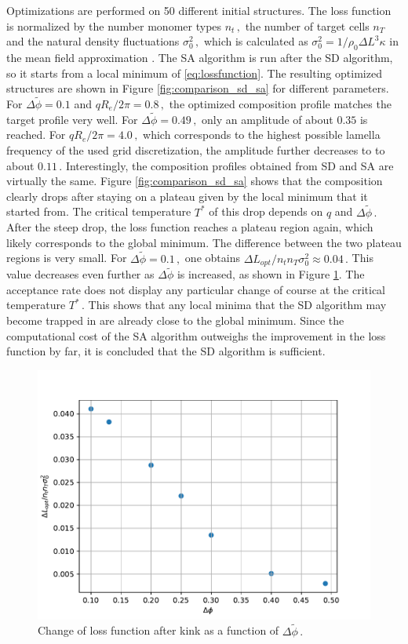 \documentclass[bachelor,       %
               twoside,        %
               BCOR10mm,       %
               ngerman, english %
               ]{GAUBM}
\begin{document}
Optimizations are performed on 50 different initial structures. The loss function is normalized by the number monomer types $n_t\,,$ the number of target cells $n_T$ and the natural density fluctuations $\sigma_0^2\,,$ which is calculated as $\sigma_0^2=1/\rho_0\Delta L^3\kappa$ in the mean field approximation \cite{Daoulas06}. The \ac{SA} algorithm is run after the \ac{SD} algorithm, so it starts from a local minimum of \eqref{eq:lossfunction}. The resulting optimized structures are shown in Figure \ref{fig:comparison_sd_sa} for different parameters. For $\Delta\tilde\phi=0.1$ and $qR_e/2\pi=0.8\,,$ the optimized composition profile matches the target profile very well. For $\Delta\tilde\phi=0.49\,,$ only an amplitude of about $0.35$ is reached. For  $qR_e/2\pi=4.0\,,$ which corresponds to the highest possible lamella frequency of the used grid discretization, the amplitude further decreases to to about $0.11\,.$ Interestingly, the composition profiles obtained from \ac{SD} and \ac{SA} are virtually the same. Figure \ref{fig:comparison_sd_sa} shows that the composition clearly drops after staying on a plateau given by the local minimum that it started from. The critical temperature $T^*$ of this drop depends on $q$ and $\Delta\tilde\phi\,.$ After the steep drop, the loss function reaches a plateau region again, which likely corresponds to the global minimum. The difference between the two plateau regions is very small. For $\Delta\tilde\phi=0.1\,,$ one obtains $\Delta L_{opt}/n_tn_T\sigma_0^2\approx 0.04\,.$ This value decreases even further as $\Delta\tilde\phi$ is increased, as shown in Figure \ref{fig:dl_dphi}. The acceptance rate does not display any particular change of course at the critical temperature $T^*\,.$ This shows that any local minima that the \ac{SD} algorithm may become trapped in are already close to the global minimum. Since the computational cost of the \ac{SA} algorithm outweighs the improvement in the loss function by far, it is concluded that the \ac{SD} algorithm is sufficient. 

\begin{figure}[htbp]
    \centering
    \includegraphics[width=0.7
    \linewidth]{figures/dL-dphi.pdf}
    \caption{Change of loss function after kink as a function of $\Delta\tilde\phi\,.$}
    \label{fig:dl_dphi}
\end{figure}
\end{document}
